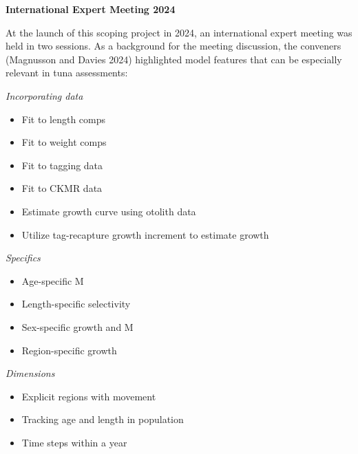 \documentclass{SCreport}
\begin{document}
\vspace{2ex}

\textbf{International Expert Meeting 2024}

At the launch of this scoping project in 2024, an international expert meeting
was held in two sessions. As a background for the meeting discussion, the
conveners (Magnusson and Davies 2024) highlighted model features that can be
especially relevant in tuna assessments:

\vspace{1ex}

\textit{Incorporating data}

\begin{itemize}
  \item Fit to length comps\\[-4.5ex]
  \item Fit to weight comps\\[-4.5ex]
  \item Fit to tagging data\\[-4.5ex]
  \item Fit to CKMR data\\[-4.5ex]
  \item Estimate growth curve using otolith data\\[-4.5ex]
  \item Utilize tag-recapture growth increment to estimate growth
\end{itemize}

\textit{Specifics}

\begin{itemize}
  \item Age-specific M\\[-4.5ex]
  \item Length-specific selectivity\\[-4.5ex]
  \item Sex-specific growth and M\\[-4.5ex]
  \item Region-specific growth
\end{itemize}

\vspace{1ex}

\textit{Dimensions}

\begin{itemize}
  \item Explicit regions with movement\\[-4.5ex]
  \item Tracking age and length in population\\[-4.5ex]
  \item Time steps within a year
\end{itemize}
\end{document}

